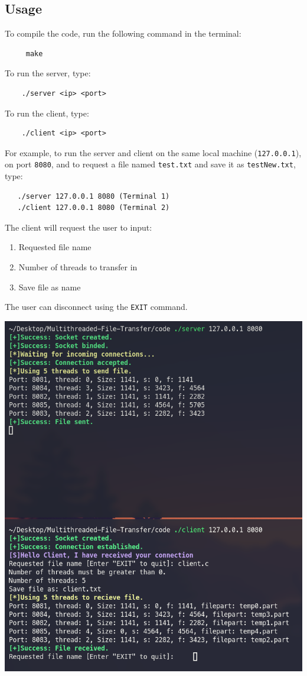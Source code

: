 \documentclass{article}
\begin{document}
\subsection{Usage}
To compile the code, run the following command in the terminal:
\begin{verbatim}
     make
\end{verbatim}
To run the server, type:
\begin{verbatim}
    ./server <ip> <port>
\end{verbatim}
To run the client, type:
\begin{verbatim}
    ./client <ip> <port>
\end{verbatim}
For example, to run the server and client on the same local machine (\texttt{127.0.0.1}), on port \texttt{8080}, and to request a file named \texttt{test.txt} and save it as \texttt{testNew.txt}, type:
\begin{verbatim}
   ./server 127.0.0.1 8080 (Terminal 1)
   ./client 127.0.0.1 8080 (Terminal 2)
\end{verbatim}
The client will request the user to input: 
\begin{enumerate}
    \item Requested file name
    \item Number of threads to transfer in
    \item Save file as name
\end{enumerate}
The user can disconnect using the \texttt{EXIT} command.
\begin{center}
    \includegraphics[scale=0.7]{usage.png}
\end{center}
\newpage
\end{document}
